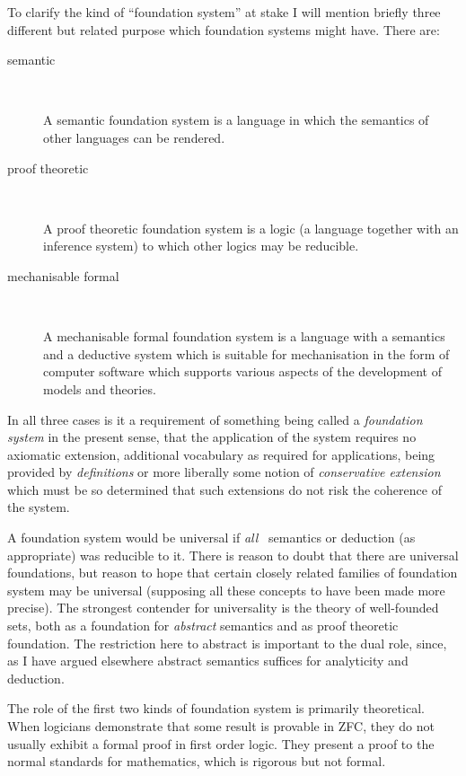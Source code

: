 \documentclass[numreferences]{rbjk}
\begin{document}
\begin{article}
To clarify the kind of ``foundation system'' at stake I will mention briefly three different but related purpose which foundation systems might have.
There are:

\begin{description}
\item[semantic]\ 

A semantic foundation system is a language in which the semantics of other languages can be rendered.

\item[proof theoretic]\ 

A proof theoretic foundation system is a logic (a language together with an inference system) to which other logics may be reducible.

\item[mechanisable formal]\ 

A mechanisable formal foundation system is a language with a semantics and a deductive system which is suitable for mechanisation in the form of computer software which supports various aspects of the development of models and theories.
\end{description}

In all three cases is it a requirement of something being called a \emph{foundation system} in the present sense, that the application of the system requires no axiomatic extension, additional vocabulary as required for applications, being provided by \emph{definitions} or more liberally some notion of \emph{conservative extension} which must be so determined that such extensions do not risk the coherence of the system.

A foundation system would be universal if \emph{all} \ semantics or deduction (as appropriate) was reducible to it.
There is reason to doubt that there are universal foundations, but reason to hope that certain closely related families of foundation system may be universal (supposing all these concepts to have been made more precise).
The strongest contender for universality is the theory of well-founded sets, both as a foundation for \emph{abstract} semantics and as proof theoretic foundation.
The restriction here to abstract is important to the dual role, since, as I have argued elsewhere \cite{rbjp001} abstract semantics suffices for analyticity and deduction.

The role of the first two kinds of foundation system is primarily theoretical.
When logicians demonstrate that some result is provable in ZFC, they do not usually exhibit a formal proof in first order logic.
They present a proof to the normal standards for mathematics, which is rigorous but not formal.


\end{article}
\end{document}
